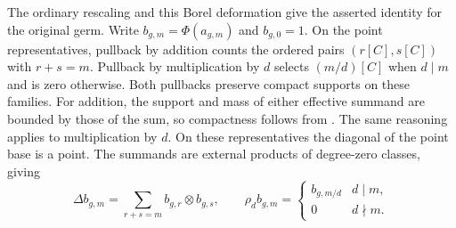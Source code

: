 The ordinary rescaling and this Borel deformation give the asserted
identity for the original germ. Write $b_{g,m}=\Phi(a_{g,m})$ and
$b_{g,0}=1$. On the point representatives, pullback by addition counts
the ordered pairs $(r[C],s[C])$ with $r+s=m$. Pullback by multiplication
by $d$ selects $(m/d)[C]$ when $d\mid m$ and is zero otherwise.
Both pullbacks preserve compact supports on these families. For addition,
the support and mass of either effective summand are bounded by those
of the sum, so compactness follows from \cite[Theorem~2.11]{DIW}.
The same reasoning applies to multiplication by $d$.
On these representatives the diagonal of the point base is a point.
The summands are external products of degree-zero classes, giving
\[
  \Delta b_{g,m}=\sum_{r+s=m}b_{g,r}\otimes b_{g,s},
  \qquad
  \rho_d b_{g,m}=
       \begin{cases} b_{g,m/d}&d\mid m,\\ 0&d\nmid m .\end{cases}
\]
